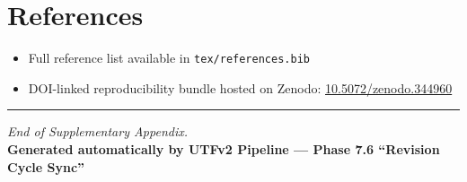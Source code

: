 





\clearpage
\section*{References}
\vspace{-0.5em}
\begin{itemize}
    \item Full reference list available in \texttt{tex/references.bib}
    \item DOI-linked reproducibility bundle hosted on Zenodo:
    \href{https://handle.test.datacite.org/10.5072/zenodo.344960}{10.5072/zenodo.344960}
\end{itemize}

\vspace{2em}
\hrule
\vspace{0.5em}
\textit{End of Supplementary Appendix.} \\
\textbf{Generated automatically by UTFv2 Pipeline — Phase 7.6 “Revision Cycle Sync”}

